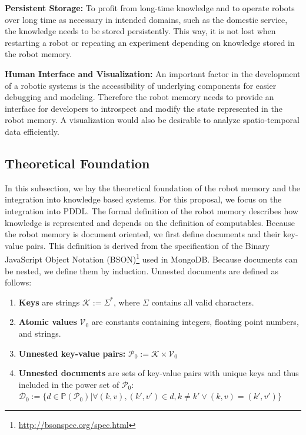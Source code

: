 \documentclass[a4paper,11pt]{article}
\begin{document}
\smallskip
\textbf{Persistent Storage:} To profit from long-time knowledge and to
operate robots over long time as necessary in intended domains,
such as the domestic service, the knowledge needs to be stored
persistently. This way, it is not lost when restarting a robot or
repeating an experiment depending on knowledge stored in the robot
memory.

\smallskip
\textbf{Human Interface and Visualization:} An important factor in the
development of a robotic systems is the accessibility of underlying
components for easier debugging and modeling. Therefore the robot
memory needs to provide an interface for developers to introspect and
modify the state represented in the robot memory. A visualization
would also be desirable to analyze spatio-temporal data efficiently.

\subsection{Theoretical Foundation}
\label{sec:formalism}
In this subsection, we lay the theoretical foundation of the robot
memory and the integration into knowledge based systems. For
this proposal, we focus on the integration into PDDL. 
The formal definition of the robot memory describes how knowledge is
represented and depends on the definition of computables. Because the
robot memory is document oriented, we first define documents and their
key-value pairs. This definition is derived from the specification of
the Binary JavaScript Object Notation
(BSON)\footnote{\url{http://bsonspec.org/spec.html}} used in MongoDB.
Because documents can be nested, we define them by induction. Unnested
documents are defined as follows:
\begin{enumerate}
\item \textbf{Keys} are strings $\mathcal{K} := \Sigma^*$, where
  $\Sigma$ contains all valid characters.
\item  \textbf{Atomic values} $\mathcal{V}_0$ are constants containing
  integers, floating point numbers, and strings.
\item \textbf{Unnested key-value pairs:} $\mathcal{P}_0:=\mathcal{K}\times\mathcal{V}_0$
\item \textbf{Unnested documents} are sets of key-value pairs with
  unique keys and thus included in the power set of $\mathcal{P}_0$:\\
  $\mathcal{D}_0:=\{
  d\in\mathbb{P}(\mathcal{P}_0)|
  \forall (k,v),(k',v')\in d , k\neq k' \vee (k,v)=(k',v')
  \}$
\end{enumerate}
\end{document}
